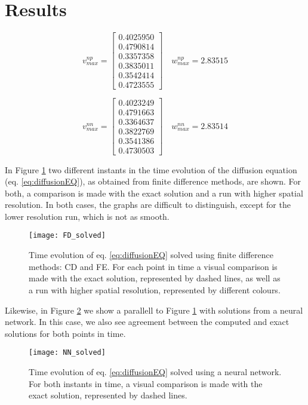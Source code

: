 \section{Results}
\label{sec:results}

\begin{equation*}
v_{max}^{np} = \begin{bmatrix}
	0.4025950 \\
	0.4790814 \\
	0.3357358 \\
    0.3835011 \\
    0.3542414 \\
    0.4723555
\end{bmatrix} \quad w_{max}^{np} =  2.83515
\end{equation*}

\begin{equation*}
v_{max}^{nn} = \begin{bmatrix}
	0.4023249 \\
	0.4791663 \\
	0.3364637 \\
	0.3822769 \\
	0.3541386 \\
	0.4730503
\end{bmatrix} \quad w_{max}^{nn} = 2.83514
\end{equation*}

In Figure \ref{fig:FDcompare} two different instants in the time evolution of the diffusion equation (eq. \ref{eq:diffusionEQ}), as obtained from finite difference methods, are shown. For both, a comparison is made with the exact solution and a run with higher spatial resolution. In both cases, the graphs are difficult to distinguish, except for the lower resolution run, which is not as smooth.
 \begin{figure}[htbp]
  	\centering
  	\texttt{[image: FD\_solved]}
  	\caption{Time evolution of eq. \ref{eq:diffusionEQ} solved using finite difference methods: CD and FE. For each point in time a visual comparison is made with the exact solution, represented by dashed lines, as well as a run with higher spatial resolution, represented by different colours.}
   \label{fig:FDcompare}
 \end{figure}

Likewise, in Figure \ref{fig:NNcompare} we show a parallell to Figure \ref{fig:FDcompare} with solutions from a neural network. In this case, we also see agreement between the computed and exact solutions for both points in time.
 \begin{figure}[htbp]
  	\centering
  	\texttt{[image: NN\_solved]}
  	\caption{Time evolution of eq. \ref{eq:diffusionEQ} solved using a neural network. For both instants in time, a visual comparison is made with the exact solution, represented by dashed lines.}
   \label{fig:NNcompare}
 \end{figure}


